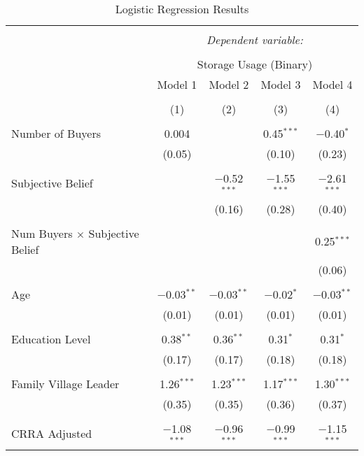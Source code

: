 
\begin{table}[H] \centering 
  \caption{Logistic Regression Results} 
  \label{tab: binary storage ~ buyers' competition at harvest} 
\footnotesize 
\begin{tabular}{@{\extracolsep{5pt}}lcccc} 
\\[-1.8ex]\hline 
\hline \\[-1.8ex] 
 & \multicolumn{4}{c}{\textit{Dependent variable:}} \\ 
\cline{2-5} 
\\[-1.8ex] & \multicolumn{4}{c}{Storage Usage (Binary)} \\ 
 & Model 1 & Model 2 & Model 3 & Model 4 \\ 
\\[-1.8ex] & (1) & (2) & (3) & (4)\\ 
\hline \\[-1.8ex] 
 Number of Buyers & 0.004 &  & 0.45$^{***}$ & $-$0.40$^{*}$ \\ 
  & (0.05) &  & (0.10) & (0.23) \\ 
  & & & & \\ 
 Subjective Belief &  & $-$0.52$^{***}$ & $-$1.55$^{***}$ & $-$2.61$^{***}$ \\ 
  &  & (0.16) & (0.28) & (0.40) \\ 
  & & & & \\ 
   Num Buyers $\times$ Subjective Belief &  &  &  & 0.25$^{***}$ \\ 
  &  &  &  & (0.06) \\ 
  & & & & \\ 
 Age & $-$0.03$^{**}$ & $-$0.03$^{**}$ & $-$0.02$^{*}$ & $-$0.03$^{**}$ \\ 
  & (0.01) & (0.01) & (0.01) & (0.01) \\ 
  & & & & \\ 
 Education Level & 0.38$^{**}$ & 0.36$^{**}$ & 0.31$^{*}$ & 0.31$^{*}$ \\ 
  & (0.17) & (0.17) & (0.18) & (0.18) \\ 
  & & & & \\ 
 Family Village Leader & 1.26$^{***}$ & 1.23$^{***}$ & 1.17$^{***}$ & 1.30$^{***}$ \\ 
  & (0.35) & (0.35) & (0.36) & (0.37) \\ 
  & & & & \\ 
 CRRA Adjusted & $-$1.08$^{***}$ & $-$0.96$^{***}$ & $-$0.99$^{***}$ & $-$1.15$^{***}$ \\ 

\end{tabular}
\end{table}
